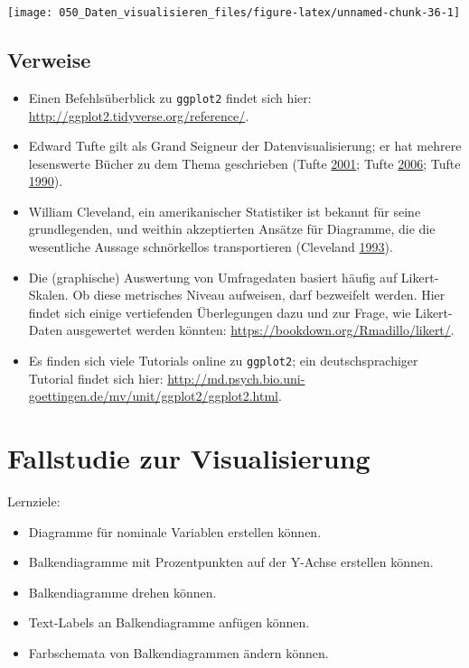\documentclass[12pt,ngerman,]{book}
\providecommand{\tightlist}{%
  \setlength{\itemsep}{0pt}\setlength{\parskip}{0pt}}
\theoremstyle{definition}
\theoremstyle{definition}
\theoremstyle{remark}
\let\BeginKnitrBlock\begin \let\EndKnitrBlock\end
\begin{document}
\begin{center}\texttt{[image: 050\_Daten\_visualisieren\_files/figure-latex/unnamed-chunk-36-1]} \end{center}

\section{Verweise}\label{verweise-3}

\begin{itemize}
\item
  Einen Befehlsüberblick zu \texttt{ggplot2} findet sich hier:
  \url{http://ggplot2.tidyverse.org/reference/}.
\item
  Edward Tufte gilt als Grand Seigneur der Datenvisualisierung; er hat
  mehrere lesenswerte Bücher zu dem Thema geschrieben (Tufte
  \protect\hyperlink{ref-1930824130}{2001}; Tufte
  \protect\hyperlink{ref-1930824165}{2006}; Tufte
  \protect\hyperlink{ref-1930824149}{1990}).
\item
  William Cleveland, ein amerikanischer Statistiker ist bekannt für
  seine grundlegenden, und weithin akzeptierten Ansätze für Diagramme,
  die die wesentliche Aussage schnörkellos transportieren (Cleveland
  \protect\hyperlink{ref-Cleveland}{1993}).
\item
  Die (graphische) Auswertung von Umfragedaten basiert häufig auf
  Likert-Skalen. Ob diese metrisches Niveau aufweisen, darf bezweifelt
  werden. Hier findet sich einige vertiefenden Überlegungen dazu und zur
  Frage, wie Likert-Daten ausgewertet werden könnten:
  \url{https://bookdown.org/Rmadillo/likert/}.
\item
  Es finden sich viele Tutorials online zu \texttt{ggplot2}; ein
  deutschsprachiger Tutorial findet sich hier:
  \url{http://md.psych.bio.uni-goettingen.de/mv/unit/ggplot2/ggplot2.html}.
\end{itemize}

\chapter{Fallstudie zur
Visualisierung}\label{fallstudie-zur-visualisierung}

\BeginKnitrBlock{rmdcaution}
Lernziele:

\begin{itemize}
\tightlist
\item
  Diagramme für nominale Variablen erstellen können.
\item
  Balkendiagramme mit Prozentpunkten auf der Y-Achse erstellen können.
\item
  Balkendiagramme drehen können.
\item
  Text-Labels an Balkendiagramme anfügen können.
\item
  Farbschemata von Balkendiagrammen ändern können.
\end{itemize}
\EndKnitrBlock{rmdcaution}
\end{document}
